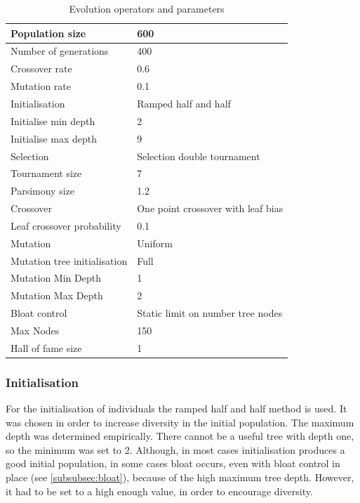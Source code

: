 \documentclass[12pt,a4paper]{article}
\begin{document}
	\begin{table}[h!]
		\centering
		\begin{tabu} to \textwidth {|X[l]|X[l]|}
			\hline
			Population size & 600 \\ \hline  
			Number of generations & 400  \\ \hline 
			Crossover rate & 0.6  \\ \hline  
			Mutation rate & 0.1  \\ \hline    \hline
			
			Initialisation & Ramped half and half \\ \hline
			Initialise min depth & 2  \\ \hline  
			Initialise max depth & 9  \\ \hline  \hline 
			
			Selection & Selection double tournament \\ \hline
			Tournament size & 7  \\ \hline  
			Parsimony size & 1.2  \\ \hline  \hline
			
			Crossover  &  One point crossover with leaf bias \\ \hline
			Leaf crossover probability & 0.1  \\ \hline
			
			Mutation & 	Uniform \\ \hline
			Mutation tree initialisation & Full \\ \hline
			Mutation Min Depth & 1  \\ \hline  
			Mutation Max Depth & 2  \\ \hline  \hline
			
			Bloat control & Static limit on number tree nodes \\ \hline
			Max Nodes & 150  \\ \hline  
			Hall of fame size & 1 \\ \hline
		\end{tabu}
		
		\caption{Evolution operators and parameters}
		\label{table:parameters}
	\end{table}
	
	\subsubsection{Initialisation}
	For the initialisation of individuals the ramped half and half method \cite{koza_genetic_1992} is used. It was chosen in order to increase diversity in the initial population. The maximum depth was determined empirically. There cannot be a useful tree with depth one, so the minimum was set to 2. Although, in most cases initialisation produces a good initial population, in some cases bloat occurs, even with bloat control in place (see \autoref{subsubsec:bloat}), because of the high maximum tree depth. However, it had to be set to a high enough value, in order to encourage diversity.
	
\end{document}
